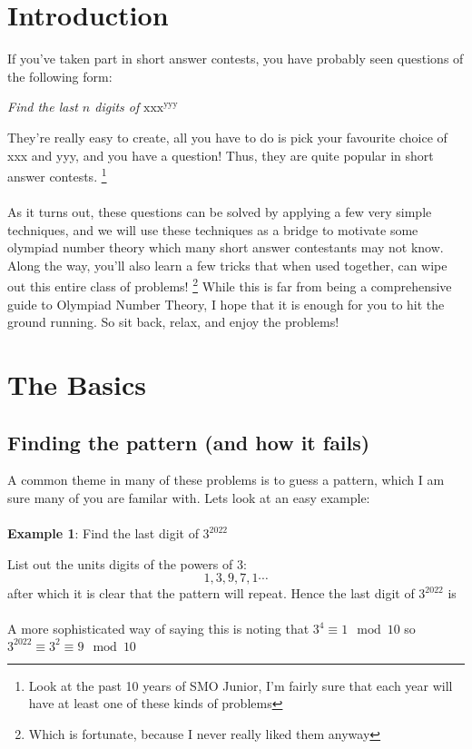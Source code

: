 \documentclass{article}
\begin{document}
\section{Introduction}
If you've taken part in short answer contests, you have probably seen questions of the following form: 
\begin{center}
\emph{Find the last $n$ digits of} $\text{xxx}^\text{yyy}$ 
\end{center}
They're really easy to create, all you have to do is pick your favourite choice of xxx and yyy, and you have a question! Thus, they are quite popular in short answer contests. \footnote{Look at the past 10 years of SMO Junior, I'm fairly sure that each year will have at least one of these kinds of problems} \\~\\ As it turns out, these questions can be solved by applying a few very simple techniques, and we will use these techniques as a bridge to motivate some olympiad number theory  which many short answer contestants may not know. Along the way, you'll also learn a few tricks that when used together, can wipe out this entire class of problems! \footnote{Which is fortunate, because I never really liked them anyway} While this is far from being a comprehensive guide to Olympiad Number Theory, I hope that it is enough for you to hit the ground running. So sit back, relax, and enjoy the problems!

\section{The Basics}
\subsection{Finding the pattern (and how it fails)} A common theme in many of these problems is to guess a pattern, which I am sure many of you are familar with. Lets look at an easy example: \\~\\
\textbf{Example 1}: Find the last digit of $3^{2022}$
\begin{solution}
List out the units digits of the powers of $3$: \[1,3,9,7,1 \cdots\] after which it is clear that the pattern will repeat. Hence the last digit of $3^{2022}$ is  \\~\\ A more sophisticated way of saying this is noting that $3^4 \equiv 1 \mod 10$ so $3^{2022} \equiv 3^2 \equiv 9 \mod 10$
\end{solution}
\end{document}
